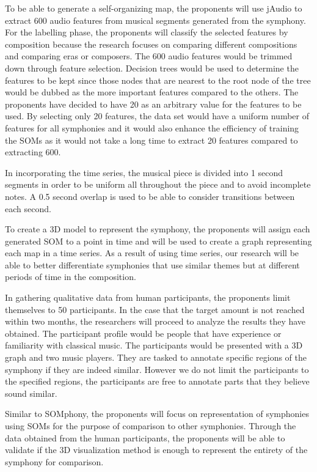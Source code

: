 To be able to generate a self-organizing map, the proponents will use jAudio to extract 600 audio features from musical segments generated from the symphony. For the labelling phase, the proponents will classify the selected features by composition because the research focuses on comparing different compositions and comparing eras or composers. The 600 audio features would be trimmed down through feature selection. Decision trees would be used to determine the features to be kept since those nodes that are nearest to the root node of the tree would be dubbed as the more important features compared to the others. The proponents have decided to have 20 as an arbitrary value for the features to be used. By selecting only 20 features, the data set would have a uniform number of features for all symphonies and it would also enhance the efficiency of training the SOMs as it would not take a long time to extract 20 features compared to extracting 600. 

In incorporating the time series, the musical piece is divided into 1 second segments in order to be uniform all throughout the piece and to avoid incomplete notes. A 0.5 second overlap is used to be able to consider transitions between each second. 

To create a 3D model to represent the symphony, the proponents will assign each generated SOM to a point in time and will be used to create a graph representing each map in a time series. As a result of using time series, our research will be able to better differentiate symphonies that use similar themes but at different periods of time in the composition.

In gathering qualitative data from human participants, the proponents limit themselves to 50 participants. In the case that the target amount is not reached within two months, the researchers will proceed to analyze the results they have obtained. The participant profile would be people that have experience or familiarity with classical music. The participants would be presented with a 3D graph and two music players. They are tasked to annotate specific regions of the symphony if they are indeed similar. However we do not limit the participants to the specified regions, the participants are free to annotate parts that they believe sound similar. 

Similar to SOMphony, the proponents will  focus on representation of symphonies using SOMs for the purpose of comparison to other symphonies. Through the data obtained from the human participants, the proponents will be able to validate if the 3D visualization method is enough to represent the entirety of the symphony for comparison.



